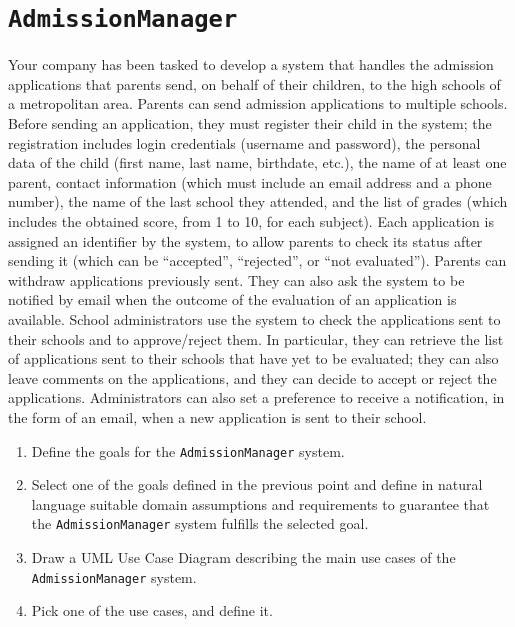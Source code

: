 \section{\texttt{AdmissionManager}}

Your company has been tasked to develop a system that handles the admission applications that parents send, on behalf of their children, to the high schools of a metropolitan
area. Parents can send admission applications to multiple schools. Before sending an application, they must register their child in the system; the registration includes 
login credentials (username and password), the personal data of the child (first name, last name, birthdate, etc.), the name of at least one parent, contact information 
(which must include an email address and a phone number), the name of the last school they attended, and the list of grades (which includes the obtained score, from 1 to 10, 
for each subject). Each application is assigned an identifier by the system, to allow parents to check its status after sending it (which can be “accepted”, “rejected”, or 
“not evaluated”). Parents can withdraw applications previously sent. They can also ask the system to be notified by email when the outcome of the evaluation of an application
is available. School administrators use the system to check the applications sent to their schools and to approve/reject them. In particular, they can retrieve the list of 
applications sent to their schools that have yet to be evaluated; they can also leave comments on the applications, and they can decide to accept or reject the applications.
Administrators can also set a preference to receive a notification, in the form of an email, when a new application is sent to their school.
\begin{enumerate}
    \item Define the goals for the \texttt{AdmissionManager} system.
    \item Select one of the goals defined in the previous point and define in natural language suitable domain assumptions and requirements to guarantee that the 
        \texttt{AdmissionManager} system fulfills the selected goal.
    \item Draw a UML Use Case Diagram describing the main use cases of the \texttt{AdmissionManager} system.
    \item Pick one of the use cases, and define it. 
\end{enumerate}

